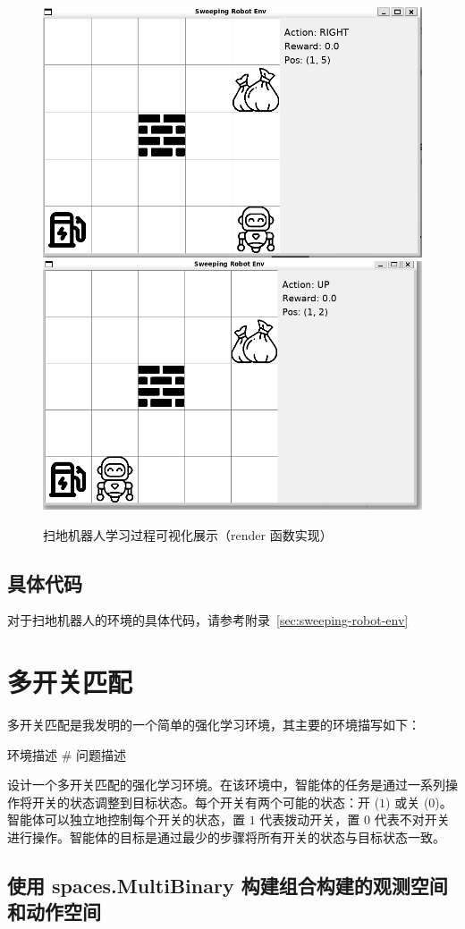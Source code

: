 \documentclass[citestyle=gb7714-2015, bibstyle=gb7714-2015,lang=cn,14pt,scheme=chinese]{elegantbook}
\begin{document}
\begin{figure}[htb]
\centering
\includegraphics[width=0.48\linewidth]{image/sweep_robot_env_render1.jpg}
\hfill
\includegraphics[width=0.48\linewidth]{image/sweep_robot_env_render2.jpg}
\caption{扫地机器人学习过程可视化展示（\textsf{render} 函数实现）}\label{fig:sweeping-robot-env-render}
\end{figure}

\subsection{具体代码}

对于扫地机器人的环境的具体代码，请参考附录~\ref{sec:sweeping-robot-env}


\section{多开关匹配}

多开关匹配是我发明的一个简单的强化学习环境，其主要的环境描写如下：

\begin{definition*}{环境描述}
\# 问题描述

    设计一个多开关匹配的强化学习环境。在该环境中，智能体的任务是通过一系列操作将开关的状态调整到目标状态。每个开关有两个可能的状态：开 (\(1\)) 或关 (\(0\))。智能体可以独立地控制每个开关的状态，置 \(1\) 代表拨动开关，置 \(0\) 代表不对开关进行操作。智能体的目标是通过最少的步骤将所有开关的状态与目标状态一致。
\end{definition*}

\subsection{使用 \textsf{spaces.MultiBinary} 构建组合构建的观测空间和动作空间}
\end{document}
